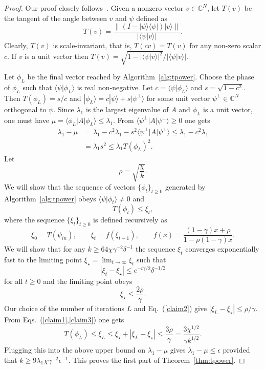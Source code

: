 \documentclass[
  reprint,            %
  amsmath,amssymb,
  aps,
  superscriptaddress, %
  longbibliography
]{revtex4-2}
\theoremstyle{definition}
\newcommand{\CC}{\mathbb{C}}
\newcommand{\la}{\langle}
\newcommand{\ra}{\rangle}
\newcommand{\be}{\begin{equation}}
\newcommand{\ee}{\end{equation}}
\begin{document}
\newpage
\begin{proof}
Our proof closely follows~\cite{yuan2013truncated}. 
Given a  nonzero  vector $v\in\CC^N$,
let $T(v)$ be the tangent of the angle between $v$ and $\psi$ defined as
\[
T(v)= \frac{\|(I-|\psi\ra\la\psi|)|v\ra\|}{|\la\psi|v\ra|}.
\]
Clearly, $T(v)$ is scale-invariant, that is, $T(c v)=T(v)$ for any non-zero scalar $c$.
If $v$ is a unit vector then $T(v)=\sqrt{1-|\la\psi|v\ra|^2}/|\la\psi|v\ra|$.

Let $\phi_L$ be the final vector reached by Algorithm~\ref{alg:tpower}. Choose the phase of $\phi_L$ such that $\la \psi|\phi_L\ra$ is real non-negative.
Let $c=\la \psi|\phi_L\ra$ and $s=\sqrt{1-c^2}$. Then $T(\phi_L)=s/c$ and 
$|\phi_L\ra = c|\psi\ra + s|\psi^\perp\ra$ for some unit vector $\psi^\perp\in \CC^N$ orthogonal to $\psi$.
Since $\lambda_1$ is the largest eigenvalue of $A$ and $\phi_L$ is a unit vector, one must have
$\mu=\la \phi_L|A|\phi_L\ra\le \lambda_1$. From $\la \psi^\perp|A|\psi^\perp\ra\ge 0$ one gets
\begin{align*}
\lambda_1-\mu & = \lambda_1 - c^2 \lambda_1 - s^2 \la \psi^\perp|A|\psi^\perp\ra \le \lambda_1 - c^2 \lambda_1 \\
& = \lambda_1 s^2 \le \lambda_1 T(\phi_L)^2.
\end{align*}
Let
\[
\rho=\sqrt{\frac{\chi}{k}}.
\]
We will show that the sequence of vectors $\{\phi_t\}_{t\ge 0}$ generated by Algorithm~\ref{alg:tpower} obeys
$\la \psi|\phi_t\ra\ne 0$ and 
\be
\label{claim1}
T(\phi_t)\le \xi_t,
\ee
where the sequence $\{\xi_t\}_{t\ge 0}$ is defined recursively as
\[
\xi_0 = T(\psi_{in}), \qquad \xi_t = f(\xi_{t-1}), \qquad f(x)= \frac{(1-\gamma)x+\rho}{1-\rho(1-\gamma)x}.
\]
We will show that for any $k\ge 64\chi\gamma^{-2}\delta^{-1}$
 the sequence $\xi_t$ converges exponentially fast to the limiting point
$\xi_\star = \lim_{t\to \infty}\xi_t$ such that 
\be
\label{claim2}
|\xi_t - \xi_\star|\le e^{-t \gamma/2} \delta^{-1/2} 
\ee
for all $t\ge 0$ and the limiting point obeys
\be
\label{claim3}
\xi_\star \le  \frac{2\rho}{\gamma}.
\ee
Our choice of the number of iterations $L$  and Eq.~(\ref{claim2}) give
$|\xi_L-\xi_\star|\le \rho/\gamma$. From Eqs.~(\ref{claim1},\ref{claim3}) one gets
\[
T(\phi_L) \le \xi_L \le \xi_\star + |\xi_L-\xi_\star| \le  \frac{3\rho}{\gamma} = 
\frac{3 \chi^{1/2}}{\gamma k^{1/2}}.
\]
Plugging  this into the above upper bound on $\lambda_1-\mu$  gives
$\lambda_1-\mu\le \epsilon$ provided that $k\ge 9\lambda_1 \chi \gamma^{-2} \epsilon^{-1}$.
This proves the first part of Theorem~\ref{thm:tpower}.


\end{proof}
\end{document}
